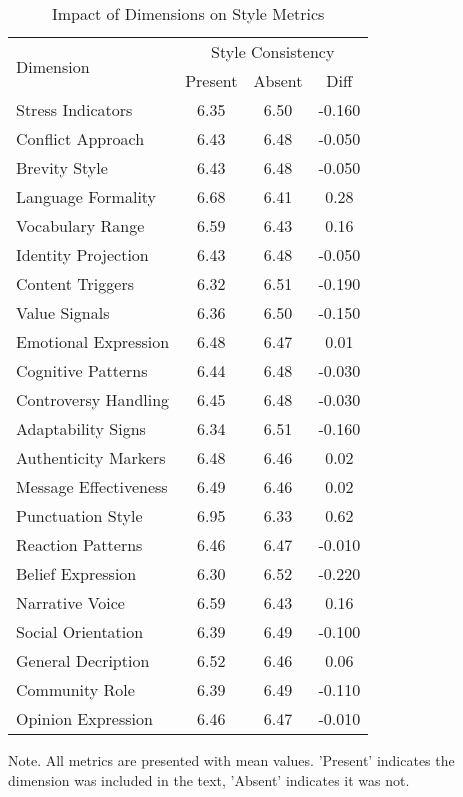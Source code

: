 \begin{table}
\caption{Impact of Dimensions on Style Metrics}
\label{table4}
\begin{tabular}{lccc}
\hline
\multirow{2}{*}{Dimension} & \multicolumn{3}{c}{Style Consistency} \\
 & Present & Absent & Diff \\
\hline
Stress Indicators & 6.35 & 6.50 & -0.160 \\
Conflict Approach & 6.43 & 6.48 & -0.050 \\
Brevity Style & 6.43 & 6.48 & -0.050 \\
Language Formality & 6.68 & 6.41 & 0.28 \\
Vocabulary Range & 6.59 & 6.43 & 0.16 \\
Identity Projection & 6.43 & 6.48 & -0.050 \\
Content Triggers & 6.32 & 6.51 & -0.190 \\
Value Signals & 6.36 & 6.50 & -0.150 \\
Emotional Expression & 6.48 & 6.47 & 0.01 \\
Cognitive Patterns & 6.44 & 6.48 & -0.030 \\
Controversy Handling & 6.45 & 6.48 & -0.030 \\
Adaptability Signs & 6.34 & 6.51 & -0.160 \\
Authenticity Markers & 6.48 & 6.46 & 0.02 \\
Message Effectiveness & 6.49 & 6.46 & 0.02 \\
Punctuation Style & 6.95 & 6.33 & 0.62 \\
Reaction Patterns & 6.46 & 6.47 & -0.010 \\
Belief Expression & 6.30 & 6.52 & -0.220 \\
Narrative Voice & 6.59 & 6.43 & 0.16 \\
Social Orientation & 6.39 & 6.49 & -0.100 \\
General Decription & 6.52 & 6.46 & 0.06 \\
Community Role & 6.39 & 6.49 & -0.110 \\
Opinion Expression & 6.46 & 6.47 & -0.010 \\
\hline
\end{tabular}
\begin{tablenotes}
\small
\item Note. All metrics are presented with mean values. 'Present' indicates the dimension was included in the text, 'Absent' indicates it was not.
\end{tablenotes}
\end{table}